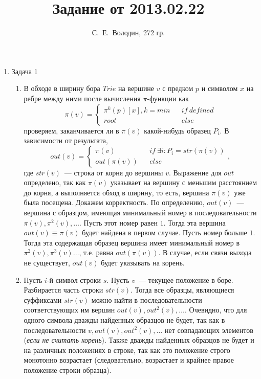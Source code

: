 \documentclass{article}
\title{Задание от 2013.02.22}
\author{С.~Е.~Володин, 272 гр.}
\date{}
\begin{document}
\maketitle
\begin{enumerate} 
\item Задача 1
\begin{enumerate}
\item В обходе в ширину бора $Trie$ на вершине $v$ с предком $p$ и символом $x$ на ребре между ними после вычисления $\pi$-функции как $$\pi(v)=\left\{ \begin{array}{lcr} \pi^k(p)[x], k=min && if\ defined\\ root && else \end{array} \right.$$
проверяем, заканчивается ли в $\pi(v)$ какой-нибудь образец $P_i$. В зависимости от результата,
$$out(v)=\left\{ \begin{array}{lcr} \pi(v) && if\ \exists i: P_i=str(\pi(v))\\ out(\pi(v)) && else \end{array} \right.,$$
где $str(v)$~--- строка от корня до вершины $v$.\newline
Выражение для $out$ определено, так как $\pi(v)$ указывает на вершину с меньшим расстоянием до корня, а выполняется обход в ширину, то есть, вершина $\pi(v)$ уже была посещена.
Докажем корректность. По определению, $out(v)$~--- вершина с образцом, имеющая минимальный номер в последовательности $\pi(v),\pi^2(v),\dots$.\newline
Пусть этот номер равен $1$. Тогда эта вершина $out(v)\equiv\pi(v)$ будет найдена в первом случае.\newline
Пусть номер больше $1$. Тогда эта содержащая образец вершина имеет минимальный номер в $\pi^2(v),\pi^3(v)\dots$, т.е. равна $out(\pi(v))$.\newline
В случае, если связи выхода не существует, $out(v)$ будет указывать на корень.
\item Пусть $i$-й символ строки $s$. Пусть $v$~--- текущее положение в боре. Разбирается часть строки $str(v)$. Тогда все образцы, являющиеся суффиксами $str(v)$ можно найти в последовательности соответствующих им вершин $out(v),out^2(v),\dots$.\newline
Очевидно, что для одного символа дважды найденных образцов не будет, так как в последовательности $v,out(v),out^2(v),\dots$ нет совпадающих элементов ({\em если не считать корень}).\newline
Также дважды найденных образцов не будет и на различных положениях в строке, так как это положение строго монотонно возрастает (следовательно, возрастает и крайнее правое положение строки образца).\newline

\end{enumerate}
\end{enumerate}
\end{document}
